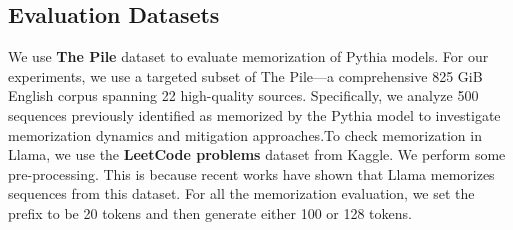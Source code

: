
\subsection{Evaluation Datasets}
\label{app:datasets}
We use \textbf{The Pile} dataset to evaluate memorization of Pythia models. For our experiments, we use a targeted subset of The Pile—a comprehensive 825 GiB English corpus spanning 22 high-quality sources. Specifically, we analyze 500 sequences previously identified as memorized by the Pythia model to investigate memorization dynamics and mitigation approaches.To check memorization in Llama, we use the \textbf{LeetCode problems} dataset from Kaggle. We perform some pre-processing. This is because recent works have shown that Llama memorizes sequences from this dataset. For all the memorization evaluation, we set the prefix to be 20 tokens and then generate either 100 or 128 tokens. \\

